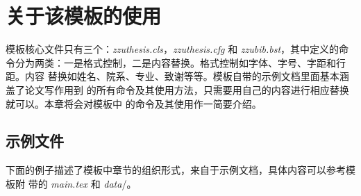 \chapter{关于该模板的使用}
\label{cha:usage}

模板核心文件只有三个：\emph{zzuthesis.cls}，\emph{zzuthesis.cfg} 和
\emph{zzubib.bst}，其中定义的命
令分为两类：一是格式控制，二是内容替换。格式控制如字体、字号、字距和行距。内容
替换如姓名、院系、专业、致谢等等。模板自带的示例文档里面基本涵盖了论文写作用到
的所有命令及其使用方法，只需要用自己的内容进行相应替换就可以。本章将会对模板中
的命令及其使用作一简要介绍。

\section{\zzuthesis{} 示例文件}

下面的例子描述了模板中章节的组织形式，来自于示例文档，具体内容可以参考模板附
带的 \emph{main.tex} 和 \emph{data}\//。
\begin{code}

\frontmatter
\makecover


\tableofcontents%
\listoffigures%
\listoftables%
\end{code}
\begin{code}
\mainmatter


\end{code}
\begin{code}
\backmatter


\begin{appendix}%
  
  
\end{appendix}



\end{code}

